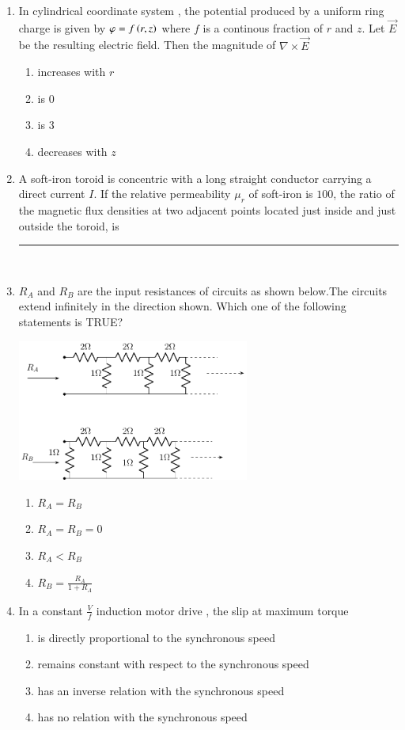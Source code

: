 \documentclass[journal,12pt,onecolumn]{IEEEtran}
\theoremstyle{remark}
\begin{document}
\begin{enumerate}
   \item In cylindrical coordinate system , the potential produced by a uniform ring charge is given by $\varphi = f\left(r,z\right)$ where $f$ is a continous fraction of $r$ and $z$. Let $\vec{E}$ be the resulting electric field. Then the magnitude of $\nabla \times \vec{E}$
   \begin{enumerate}
       \item increases with $r$
       \item is $0$
       \item is $3$
       \item decreases with $z$
   \end{enumerate}
   \item A soft-iron toroid is concentric with a long straight conductor carrying a direct current $I$. If the relative permeability $\mu_r$ of soft-iron is $100$, the ratio of the magnetic flux densities at two adjacent points located just inside and just outside the toroid, is \rule{3cm}{0.15mm}\\
   \item $R_A$ and $R_B$ are the input resistances of circuits as shown below.The circuits extend infinitely in the direction shown. Which one of the following statements is TRUE?
 \begin{center}

\includegraphics[width=0.6\textwidth]{figs/fig3/main} 
\end{center}
	   
   \begin{multicols}{4}
       \begin{enumerate}
           \item $R_A = R_B$
           \item $R_A = R_B = 0$
           \item $R_A < R_B$
           \item $R_B = \frac{R_A}{1+R_A}$
       \end{enumerate}
       \end{multicols}
       \item In a constant $\frac{V}{f}$ induction motor drive , the slip at maximum torque
       \begin{enumerate}
           \item is directly proportional to the synchronous speed
           \item remains constant with respect to the synchronous speed
\item  has an inverse relation with the synchronous speed
\item has no relation with the synchronous speed
       \end{enumerate}

       \end{enumerate}
       
\end{document}
